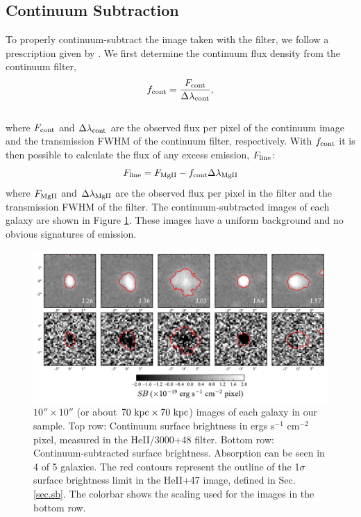 \documentclass[twocolumn]{aastex62}
\begin{document}
\subsection{Continuum Subtraction}\label{subsec.cont_sub}

To properly continuum-subtract the image taken with the  filter, we follow a prescription given by \cite{Battaia_2015}. 
We first determine the continuum flux density from the continuum filter,
\begin{equation}
f_{\rm{cont}}=\frac{F_{\rm{cont}}}{\Delta \lambda_{\rm{cont}}},
\end{equation}\\
where $F_{\rm{cont}}$ and $\Delta \lambda_{\rm{cont}}$ are the observed flux per pixel of the continuum image and the transmission FWHM of the continuum filter, respectively. With $f_{\rm cont}$ it is then possible to calculate the flux of any excess emission, $F_{\rm{line}}$:
\begin{equation}
F_{\rm{line}}=F_{\rm{MgII}}-f_{\rm{cont}} \Delta \lambda_{\rm{MgII}}
\label{eq:subtraction}
\end{equation}
where $F_{\rm{MgII}}$ and $\Delta \lambda_{\rm MgII}$ are the observed flux per pixel in the  filter and the transmission FWHM of the  filter. The continuum-subtracted images of each galaxy are shown in Figure \ref{fig:stamp_images}. %
These
images have a uniform background and no obvious signatures of emission.

\begin{figure}[!htb]
\centering
\includegraphics[scale=0.7]{stamps.pdf}
\caption{ $10'' \times 10''$ (or about $70 \rm \ kpc \times 70 \rm \ kpc $) images of each galaxy in our sample. Top row: Continuum surface brightness in ergs s$^{-1}$ cm$^{-2}$ pixel, measured in the HeII/3000+48 filter. Bottom row: Continuum-subtracted  surface brightness.  Absorption can be seen in 4 of 5 galaxies. The red contours represent the outline of the 1$\sigma$ surface brightness limit in the HeII+47 image, defined in Sec. \ref{sec.sb}. The colorbar shows the scaling used for the  images in the bottom row.}
\label{fig:stamp_images}
\end{figure}
\end{document}
